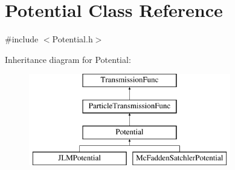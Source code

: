 \hypertarget{classPotential}{\section{Potential Class Reference}
\label{classPotential}
}


{\ttfamily \#include $<$Potential.\-h$>$}

Inheritance diagram for Potential\-:\begin{figure}[H]
\begin{center}
\leavevmode
\includegraphics[height=4.000000cm]{dc/d66/classPotential}
\end{center}
\end{figure}

